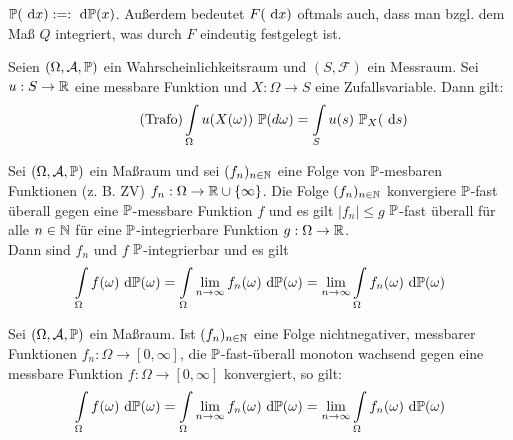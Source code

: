 \begin{notation}
$\P(\d x):=:\d\P(x)$. Außerdem bedeutet $F(\d x)$ oftmals auch, dass man bzgl. dem Maß $Q$ integriert, was durch $F$ eindeutig festgelegt ist.
\end{notation}

\begin{satz}[Transformationssatz]\label{satzTransformationssatz}\enter
Seien $(\Omega,\A,\P)$ ein Wahrscheinlichkeitsraum und $(S,\mathcal{F})$ ein Messraum.
Sei $u:S\to\R$ eine messbare Funktion und $X:\Omega\to S$ eine Zufallsvariable. Dann gilt:
\begin{align}\label{eqTrafo}\tag{Trafo}
\int\limits_\Omega u(X(\omega))~\P(d\omega)=\int\limits_S u(s)~\P_X(\d s)
\end{align}
\end{satz}

\begin{satz}\label{satzMajorisierteKonvergenz}\enter
Sei $(\Omega,\A,\P)$ ein Maßraum und sei $(f_n)_{n\in\N}$ eine Folge von $\P$-mesbaren Funktionen (z. B. ZV) $f_n:\Omega\to\R\cup\lbrace\infty\rbrace$. Die Folge $(f_n)_{n\in\N}$ konvergiere $\P$-fast überall gegen eine $\P$-messbare Funktion $f$ und es gilt $|f_n|\leq g$ $\P$-fast überall für alle $n\in\N$ für eine $\P$-integrierbare Funktion $g:\Omega\to\R$.\\
Dann sind $f_n$ und $f$ $\P$-integrierbar und es gilt
\begin{align*}
\int\limits_\Omega f(\omega)\d\P(\omega)=\int\limits_\Omega \limn f_n(\omega)\d\P(\omega)
=\limn\int\limits_\Omega f_n(\omega)\d\P(\omega)
\end{align*}
\end{satz}

\begin{satz}\label{satzMonotoneKonvergenz}\enter
Sei $(\Omega,\A,\P)$ ein Maßraum. Ist $(f_n)_{n\in\N}$ eine Folge nichtnegativer, messbarer Funktionen $f_n:\Omega\to[0,\infty]$, die $\P$-fast-überall monoton wachsend gegen eine messbare Funktion $f:\Omega\to[0,\infty]$ konvergiert, so gilt:
\begin{align*}
\int\limits_\Omega f(\omega)\d\P(\omega)=\int\limits_\Omega \limn f_n(\omega)\d\P(\omega)
=\limn\int\limits_\Omega f_n(\omega)\d\P(\omega)
\end{align*}
\end{satz}



